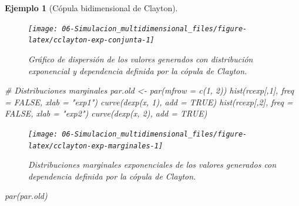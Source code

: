 \documentclass[
]{book}
\newenvironment{Shaded}{\begin{snugshade}}{\end{snugshade}}
\newcommand{\AttributeTok}[1]{\textcolor[rgb]{0.77,0.63,0.00}{#1}}
\newcommand{\CommentTok}[1]{\textcolor[rgb]{0.56,0.35,0.01}{\textit{#1}}}
\newcommand{\ConstantTok}[1]{\textcolor[rgb]{0.00,0.00,0.00}{#1}}
\newcommand{\DecValTok}[1]{\textcolor[rgb]{0.00,0.00,0.81}{#1}}
\newcommand{\FunctionTok}[1]{\textcolor[rgb]{0.00,0.00,0.00}{#1}}
\newcommand{\NormalTok}[1]{#1}
\newcommand{\OtherTok}[1]{\textcolor[rgb]{0.56,0.35,0.01}{#1}}
\newcommand{\StringTok}[1]{\textcolor[rgb]{0.31,0.60,0.02}{#1}}
\theoremstyle{break}
\newtheorem{example}{Ejemplo}[chapter]
\theoremstyle{nonumberplain}
\begin{document}
\begin{example}[Cópula bidimensional de Clayton]
\begin{figure}[!htb]

{\centering \texttt{[image: 06-Simulacion\_multidimensional\_files/figure-latex/cclayton-exp-conjunta-1]} 

}

\caption{Gráfico de dispersión de los valores generados con distribución exponencial y dependencia definida por la cópula de Clayton.}\label{fig:cclayton-exp-conjunta}
\end{figure}

\begin{Shaded}
\begin{Highlighting}[]
\CommentTok{\# Distribuciones marginales}
\NormalTok{par.old }\OtherTok{\textless{}{-}} \FunctionTok{par}\NormalTok{(}\AttributeTok{mfrow =} \FunctionTok{c}\NormalTok{(}\DecValTok{1}\NormalTok{, }\DecValTok{2}\NormalTok{))}
\FunctionTok{hist}\NormalTok{(rcexp[,}\DecValTok{1}\NormalTok{], }\AttributeTok{freq =} \ConstantTok{FALSE}\NormalTok{, }\AttributeTok{xlab =} \StringTok{"exp1"}\NormalTok{)}
\FunctionTok{curve}\NormalTok{(}\FunctionTok{dexp}\NormalTok{(x, }\DecValTok{1}\NormalTok{), }\AttributeTok{add =} \ConstantTok{TRUE}\NormalTok{)}
\FunctionTok{hist}\NormalTok{(rcexp[,}\DecValTok{2}\NormalTok{], }\AttributeTok{freq =} \ConstantTok{FALSE}\NormalTok{, }\AttributeTok{xlab =} \StringTok{"exp2"}\NormalTok{)}
\FunctionTok{curve}\NormalTok{(}\FunctionTok{dexp}\NormalTok{(x, }\DecValTok{2}\NormalTok{), }\AttributeTok{add =} \ConstantTok{TRUE}\NormalTok{)}
\end{Highlighting}
\end{Shaded}

\begin{figure}[!htb]

{\centering \texttt{[image: 06-Simulacion\_multidimensional\_files/figure-latex/cclayton-exp-marginales-1]} 

}

\caption{Distribuciones marginales exponenciales de los valores generados con dependencia definida por la cópula de Clayton.}\label{fig:cclayton-exp-marginales}
\end{figure}

\begin{Shaded}
\begin{Highlighting}[]
\FunctionTok{par}\NormalTok{(par.old)}
\end{Highlighting}
\end{Shaded}

\end{example}
\end{document}
